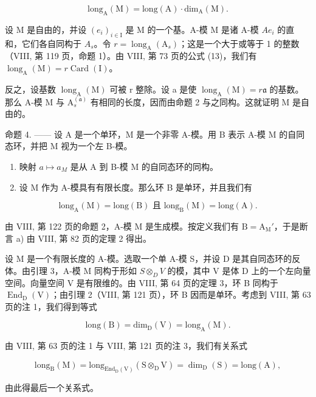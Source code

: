 \[
\mathrm{long} _ {\mathrm{A}} (\mathrm{M}) = \mathrm{long} (\mathrm{A}) \cdot \mathrm{dim} _ {\mathrm{A}} (\mathrm{M}).\tag{1}
\]

设 M 是自由的，并设 \((e_{i})_{i\in\mathrm{I}}\) 是 M 的一个基。A-模 M 是诸 A-模 \(Ae_{i}\) 的直和，它们各自同构于 \(A_{s}\)。令 \(r=\operatorname{long}_{\mathrm{A}}(\mathrm{A}_{s})\)；这是一个大于或等于 1 的整数（VIII, 第 119 页，命题 1）。由 VIII, 第 73 页的公式 (13)，我们有 \(\operatorname{long}_{\mathrm{A}}(\mathrm{M})=r\operatorname{Card}(\mathrm{I})\)。

反之，设基数 \(\operatorname{long}_{\mathrm{A}}(\mathrm{M})\) 可被 r 整除。设 a 是使 \(\operatorname{long}_{\mathrm{A}}(\mathrm{M}) = r\mathfrak{a}\) 的基数。那么 A-模 M 与 \(\mathrm{A}_{s}^{(\mathfrak{a})}\) 有相同的长度，因而由命题 2 与之同构。这就证明 M 是自由的。

命题 4. —— 设 A 是一个单环，M 是一个非零 A-模。用 B 表示 A-模 M 的自同态环，并把 M 视为一个左 B-模。

\begin{enumerate}
\def\labelenumi{\alph{enumi})}
\item
  映射 \(a \mapsto a_{M}\) 是从 A 到 B-模 M 的自同态环的同构。
\item
  设 M 作为 A-模具有有限长度。那么环 B 是单环，并且我们有
\end{enumerate}

\[
\mathrm{long} _ {\mathrm{A}} (\mathrm{M}) = \mathrm{long} (\mathrm{B}) \text{ 且 } \mathrm{long} _ {\mathrm{B}} (\mathrm{M}) = \mathrm{long} (\mathrm{A}).\tag{2}
\]

由 VIII, 第 122 页的命题 2，A-模 M 是生成模。按定义我们有 \(\mathrm{B} = \mathrm{A}_{\mathrm{M}}'\)，于是断言 a) 由 VIII, 第 82 页的定理 2 得出。

设 M 是一个有限长度的 A-模。选取一个单 A-模 S，并设 D 是其自同态环的反体。由引理 3，A-模 M 同构于形如 \(S \otimes_{D} V\) 的模，其中 V 是体 D 上的一个左向量空间。向量空间 V 是有限维的。由 VIII, 第 64 页的定理 3，环 B 同构于 \(\operatorname{End}_{\mathrm{D}}(\mathrm{V})\)；由引理 2（VIII, 第 121 页），环 B 因而是单环。考虑到 VIII, 第 63 页的注 1，我们得到等式

\[
\mathrm{long(B)} = \mathrm {dim_ {D} (V)} = \mathrm {long_ {A} (M)}.
\]

由 VIII, 第 63 页的注 1 与 VIII, 第 121 页的注 3，我们有关系式

\[
\mathrm{long} _ {\mathrm{B}} (\mathrm{M}) = \mathrm{long} _ {\mathrm{End} _ {\mathrm{D}} (\mathrm{V})} (\mathrm{S} \otimes_ {\mathrm{D}} \mathrm{V}) = \dim_ {\mathrm{D}} (\mathrm{S}) = \mathrm{long} (\mathrm{A}),
\]

由此得最后一个关系式。

